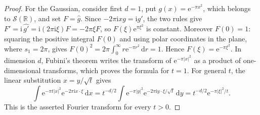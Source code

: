 \begin{proof}
For the Gaussian, consider first $d=1$, put $g(x)=\mathrm e^{-\pi x^2}$, which belongs to $\mathcal S(\mathbb R)$, and set $F=\widehat g$. Since $-2\pi\mathrm i xg=\mathrm i g'$, the two rules give $F'=\mathrm i\,\widehat{g'}=\mathrm i(2\pi\mathrm i\xi)F=-2\pi\xi F$, so $F(\xi)\mathrm e^{\pi\xi^2}$ is constant. Moreover $F(0)=1$: squaring the positive integral $F(0)$ and using polar coordinates in the plane, where $s_1=2\pi$, gives $F(0)^2=2\pi\int_0^\infty r\mathrm e^{-\pi r^2}\,\mathrm d r=1$. Hence $F(\xi)=\mathrm e^{-\pi\xi^2}$. In dimension $d$, Fubini's theorem writes the transform of $\mathrm e^{-\pi|x|^2}$ as a product of one-dimensional transforms, which proves the formula for $t=1$. For general $t$, the linear substitution $x=y/\sqrt t$ gives
\[
 \int\mathrm e^{-\pi t|x|^2}\mathrm e^{-2\pi\mathrm i x\cdot\xi}\,\mathrm d x=t^{-d/2}\int\mathrm e^{-\pi|y|^2}\mathrm e^{-2\pi\mathrm i y\cdot\xi/\sqrt t}\,\mathrm d y=t^{-d/2}\mathrm e^{-\pi|\xi|^2/t}.
\]
This is the asserted Fourier transform for every $t>0$.
\end{proof}

